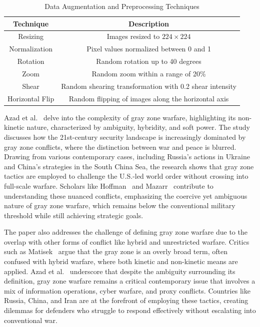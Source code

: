 \documentclass[conference]{IEEEtran}
\begin{document}
\begin{table}[h]
\centering
\caption{Data Augmentation and Preprocessing Techniques}
\begin{tabular}{|c|c|}
\hline
\textbf{Technique}        & \textbf{Description}                                    \\ \hline
Resizing                  & Images resized to $224 \times 224$                       \\ \hline
Normalization             & Pixel values normalized between 0 and 1                 \\ \hline
Rotation                  & Random rotation up to 40 degrees                        \\ \hline
Zoom                      & Random zoom within a range of 20\%                      \\ \hline
Shear                     & Random shearing transformation with 0.2 shear intensity \\ \hline
Horizontal Flip           & Random flipping of images along the horizontal axis     \\ \hline
\end{tabular}
\label{tab:data_augmentation}
\end{table}


Azad et al.~\cite{b17} delve into the complexity of gray zone warfare, highlighting its non-kinetic nature, characterized by ambiguity, hybridity, and soft power. The study discusses how the 21st-century security landscape is increasingly dominated by gray zone conflicts, where the distinction between war and peace is blurred. Drawing from various contemporary cases, including Russia's actions in Ukraine and China’s strategies in the South China Sea, the research shows that gray zone tactics are employed to challenge the U.S.-led world order without crossing into full-scale warfare. Scholars like Hoffman~\cite{b18} and Mazarr~\cite{b19} contribute to understanding these nuanced conflicts, emphasizing the coercive yet ambiguous nature of gray zone warfare, which remains below the conventional military threshold while still achieving strategic goals.

The paper also addresses the challenge of defining gray zone warfare due to the overlap with other forms of conflict like hybrid and unrestricted warfare. Critics such as Matisek~\cite{b20} argue that the gray zone is an overly broad term, often confused with hybrid warfare, where both kinetic and non-kinetic means are applied. Azad et al.~\cite{b17} underscore that despite the ambiguity surrounding its definition, gray zone warfare remains a critical contemporary issue that involves a mix of information operations, cyber warfare, and proxy conflicts. Countries like Russia, China, and Iran are at the forefront of employing these tactics, creating dilemmas for defenders who struggle to respond effectively without escalating into conventional war.
\end{document}
